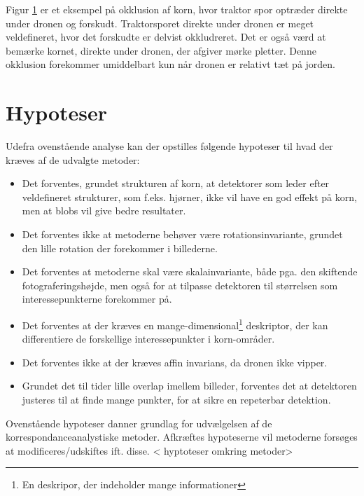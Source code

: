 \begin{itemize}
{\begin{figure}[H]
    \begin{center}    
       \caption{\textcolor{gray}{\footnotesize \textit{ }}}
    \label{fig:okklusion}
     \end{center}
     \vspace{-2.5em}
  \end{figure} \noindent
Figur \ref{fig:okklusion} er et eksempel på okklusion af korn, hvor traktor spor optræder direkte under dronen og forskudt. Traktorsporet direkte under dronen er meget veldefineret, hvor det forskudte er delvist okkludreret. Det er også værd at bemærke kornet, direkte under dronen, der afgiver mørke pletter. Denne okklusion forekommer umiddelbart kun når dronen er relativt tæt på jorden.}
\end{itemize}
\section{Hypoteser}
Udefra ovenstående analyse kan der opstilles følgende hypoteser til hvad der kræves af de udvalgte metoder:
\begin{itemize}
\item{ Det forventes, grundet strukturen af korn, at detektorer som leder efter veldefineret strukturer, som f.eks. hjørner, ikke vil have en god effekt på korn, men at blobs vil give bedre resultater.}
\item{ Det forventes ikke at metoderne behøver være rotationsinvariante, grundet den lille rotation der forekommer i billederne. }
\item{ Det forventes at metoderne skal være skalainvariante, både pga. den skiftende fotograferingshøjde, men også for at tilpasse detektoren til størrelsen som interessepunkterne forekommer på.}
\item{ Det forventes at der kræves en mange-dimensional\footnote{En deskripor, der indeholder mange informationer} deskriptor, der kan differentiere de forskellige interessepunkter i korn-områder.}
\item{ Det forventes ikke at der kræves affin invarians, da dronen ikke vipper. }
\item{ Grundet det til tider lille overlap imellem billeder, forventes det at detektoren justeres til at finde mange punkter, for at sikre en repeterbar detektion.}
\end{itemize}
Ovenstående hypoteser danner grundlag for udvælgelsen af de korrespondanceanalystiske metoder. Afkræftes hypoteserne vil metoderne forsøges at modificeres/udskiftes ift. disse.
< hyptoteser omkring metoder>